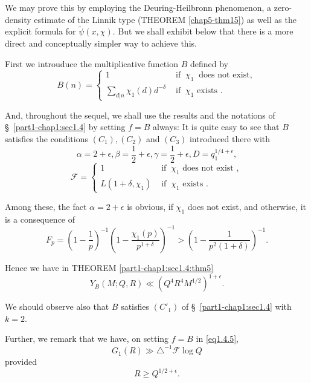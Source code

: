 We may prove this by employing the Deuring-Heilbronn pheno\-menon, a
zero-density estimate of the Linnik type (THEOREM \ref{chap5-thm15})
as well as the 
explicit formula for $\tilde{\psi}(x,\chi)$. But we shall exhibit
below that there is a more direct and conceptually simpler way to
achieve this. 

First we introuduce the multiplicative function $B$ defined by
\begin{equation*}
  B(n) = 
  \begin{cases}
    1 & \text{ if }~ \chi_1 ~ \text{ does not exist},\\
    \sum\limits_{d|n}\chi_1(d)d^{-\delta} & \text{ if }~ \chi_1 \text{ exists }.
  \end{cases}
\end{equation*}

And, throughout the sequel, we shall use the results and the notations
of \S~\ref{part1-chap1:sec1.4} by setting $f = B$ always: It is quite
easy to see that 
$B$ satisfies the conditions $(C_1),(C_2)$ and $(C_3)$ introduced
there with 
$$
\alpha = 2 + \epsilon, \beta = \frac{1}{2} + \epsilon, \gamma =
\frac{1}{2} + \epsilon, D = q_1^{1/4+\epsilon }, 
$$
\begin{equation*}
  \mathscr{F}=
  \begin{cases}
    1  & \text{ if }~ \chi_1  \text{ does not exist },\\
    L  (1+\delta, \chi_1 ) & \text{ if }~ \chi_1 \text{ exists }.
  \end{cases}
\end{equation*}

Among these, the fact $\alpha = 2 + \epsilon  $ is obvious, if
$\chi_1$ does not exist, and otherwise, it is a consequence of 
\begin{equation*}
  F_p = \left(1-\frac{1}{p}\right)^{-1}\left(1-\frac{\chi_1
    (p)}{p^{1+\delta}}\right)^{-1} > \left(1-\frac{1}{p^2(1+\delta )
  }\right )^{-1}.\tag{6.2.3} \label{eq6.2.3}
\end{equation*}\pageoriginale

Hence we have in THEOREM \ref{part1-chap1:sec1.4:thm5}
\begin{equation*}
  Y_B(M;Q,R) \ll (Q^4R^4M^{1/2})^{1+\epsilon }.\tag{6.2.4}\label{eq6.2.4}
\end{equation*}

We should observe also that $B$ satisfies $(C'_1)$ of
\S~\ref{part1-chap1:sec1.4} with $k = 2$. 

Further, we remark that we have, on setting $f = B$ in \eqref{eq1.4.5},
\begin{equation*}
G_1(R) \gg \triangle^{-1}\mathscr{F}\log Q\tag{6.2.5}\label{eq6.2.5}
\end{equation*}
provided
\begin{equation*}
  R \geq Q^{1/2+\epsilon }.\tag{6.2.6}\label{eq6.2.6}
\end{equation*}

